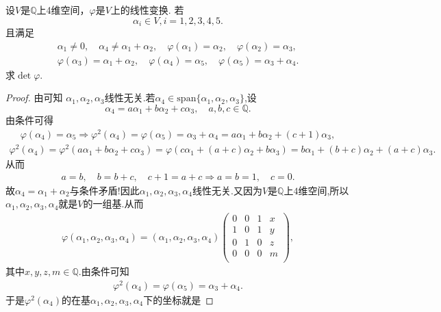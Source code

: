 \documentclass[../../main.tex]{subfiles}%
\begin{document}
\begin{example}
设$V$是$\mathbb{Q}$上4维空间，$\varphi$是$V$上的线性变换. 若
$$\alpha_i \in V, i = 1,2,3,4,5.$$
且满足
\begin{gather*}
\alpha _1\ne 0,\quad \alpha _4\ne \alpha _1+\alpha _2,\quad \varphi( \alpha _1)=\alpha _2,\quad \varphi (\alpha _2)=\alpha _3,
\\
\varphi (\alpha _3)=\alpha _1+\alpha _2,\quad \varphi (\alpha _4)=\alpha _5,\quad \varphi (\alpha _5)=\alpha _3+\alpha _4.
\end{gather*}
求$\det \varphi$.
\end{example}
\begin{proof}

由可知
$\alpha_1,\alpha_2,\alpha_3$线性无关.若$\alpha_4\in \mathrm{span}\{\alpha_1,\alpha_2,\alpha_3\}$,设
$$\alpha_4=a\alpha_1+b\alpha_2+c\alpha_3,\quad a,b,c\in \mathbb{Q}.$$
由条件可得
\begin{align*}
\varphi (\alpha_4)=\alpha_5\Longrightarrow \varphi^2(\alpha_4)=\varphi (\alpha_5)=\alpha_3+\alpha_4=a\alpha_1+b\alpha_2+(c+1)\alpha_3,
\end{align*}
\begin{align*}
\varphi^2(\alpha_4)=\varphi^2(a\alpha_1+b\alpha_2+c\alpha_3)=\varphi\left(c\alpha_1+(a+c)\alpha_2+b\alpha_3\right)=b\alpha_1+(b+c)\alpha_2+(a+c)\alpha_3.
\end{align*}
从而
\begin{align*}
a=b,\quad b=b+c,\quad c+1=a+c\Longrightarrow a=b=1,\quad c=0.
\end{align*}
故$\alpha_4=\alpha_1+\alpha_2$与条件矛盾!因此$\alpha_1,\alpha_2,\alpha_3,\alpha_4$线性无关.又因为$V$是$\mathbb{Q}$上$4$维空间,所以$\alpha_1,\alpha_2,\alpha_3,\alpha_4$就是$V$的一组基.从而
\begin{align*}
\varphi\left( \alpha_1,\alpha_2,\alpha_3,\alpha_4 \right)=\left( \alpha_1,\alpha_2,\alpha_3,\alpha_4 \right)\begin{pmatrix}
0&		0&		1&		x\\
1&		0&		1&		y\\
0&		1&		0&		z\\
0&		0&		0&		m\\
\end{pmatrix},
\end{align*}
其中$x,y,z,m\in \mathbb{Q}$.由条件可知
\begin{align*}
\varphi^2(\alpha_4)=\varphi (\alpha_5)=\alpha_3+\alpha_4.
\end{align*}
于是$\varphi^2(\alpha_4)$的在基$\alpha_1,\alpha_2,\alpha_3,\alpha_4$下的坐标就是

\end{proof}
\end{document}
